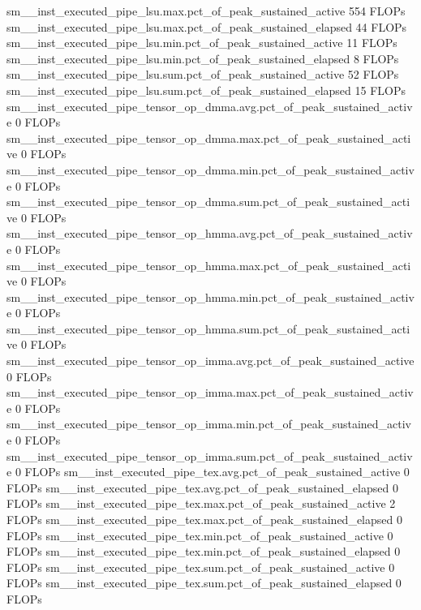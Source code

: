 sm__inst_executed_pipe_lsu.max.pct_of_peak_sustained_active                                  554 FLOPs
sm__inst_executed_pipe_lsu.max.pct_of_peak_sustained_elapsed                                  44 FLOPs
sm__inst_executed_pipe_lsu.min.pct_of_peak_sustained_active                                   11 FLOPs
sm__inst_executed_pipe_lsu.min.pct_of_peak_sustained_elapsed                                   8 FLOPs
sm__inst_executed_pipe_lsu.sum.pct_of_peak_sustained_active                                   52 FLOPs
sm__inst_executed_pipe_lsu.sum.pct_of_peak_sustained_elapsed                                  15 FLOPs
sm__inst_executed_pipe_tensor_op_dmma.avg.pct_of_peak_sustained_active                         0 FLOPs
sm__inst_executed_pipe_tensor_op_dmma.max.pct_of_peak_sustained_active                         0 FLOPs
sm__inst_executed_pipe_tensor_op_dmma.min.pct_of_peak_sustained_active                         0 FLOPs
sm__inst_executed_pipe_tensor_op_dmma.sum.pct_of_peak_sustained_active                         0 FLOPs
sm__inst_executed_pipe_tensor_op_hmma.avg.pct_of_peak_sustained_active                         0 FLOPs
sm__inst_executed_pipe_tensor_op_hmma.max.pct_of_peak_sustained_active                         0 FLOPs
sm__inst_executed_pipe_tensor_op_hmma.min.pct_of_peak_sustained_active                         0 FLOPs
sm__inst_executed_pipe_tensor_op_hmma.sum.pct_of_peak_sustained_active                         0 FLOPs
sm__inst_executed_pipe_tensor_op_imma.avg.pct_of_peak_sustained_active                         0 FLOPs
sm__inst_executed_pipe_tensor_op_imma.max.pct_of_peak_sustained_active                         0 FLOPs
sm__inst_executed_pipe_tensor_op_imma.min.pct_of_peak_sustained_active                         0 FLOPs
sm__inst_executed_pipe_tensor_op_imma.sum.pct_of_peak_sustained_active                         0 FLOPs
sm__inst_executed_pipe_tex.avg.pct_of_peak_sustained_active                                    0 FLOPs
sm__inst_executed_pipe_tex.avg.pct_of_peak_sustained_elapsed                                   0 FLOPs
sm__inst_executed_pipe_tex.max.pct_of_peak_sustained_active                                    2 FLOPs
sm__inst_executed_pipe_tex.max.pct_of_peak_sustained_elapsed                                   0 FLOPs
sm__inst_executed_pipe_tex.min.pct_of_peak_sustained_active                                    0 FLOPs
sm__inst_executed_pipe_tex.min.pct_of_peak_sustained_elapsed                                   0 FLOPs
sm__inst_executed_pipe_tex.sum.pct_of_peak_sustained_active                                    0 FLOPs
sm__inst_executed_pipe_tex.sum.pct_of_peak_sustained_elapsed                                   0 FLOPs
